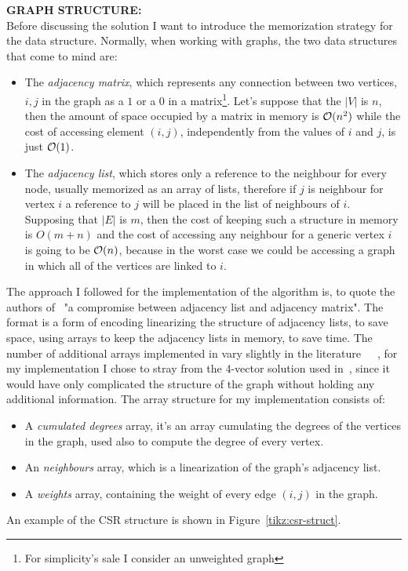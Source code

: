 \documentclass[a4paper,10pt]{article}
\begin{document}
\bigskip
{}
\makeatletter{}\makeatother\label{sec:graph-structure}
\noindent
\textbf{GRAPH STRUCTURE:}
\\
Before discussing the solution I want to introduce the memorization strategy for the data structure. Normally, when working with graphs, the two data structures that come to mind are:
\begin{itemize}
	\item The \emph{adjacency matrix}, which represents any connection between two vertices, $i, j$ in the graph as a $1$ or a $0$ in a matrix\footnote{For simplicity's sale I consider an unweighted graph}. Let's suppose that the $|V|$ is $n$, then the amount of space occupied by a matrix in memory is $\mathcal{O}(n^2)$ while the cost of accessing element $(i, j)$, independently from the values of $i$ and $j$, is just $\mathcal{O}(1)$.
	\item The \emph{adjacency list}, which stores only a reference to the neighbour for every node, usually memorized as an array of lists, therefore if $j$ is neighbour for vertex $i$ a reference to $j$ will be placed in the list of neighbours of $i$. Supposing that $|E|$ is $m$, then the cost of keeping such a structure in memory is $O(m + n)$ and the cost of accessing any neighbour for a generic vertex $i$ is going to be $\mathcal{O}(n)$, because in the worst case we could be accessing a graph in which all of the vertices are linked to $i$.
\end{itemize}
The approach I followed for the implementation of the algorithm is, to quote the authors of~\cite{generic-he-boruvka} "a compromise between adjacency list and adjacency matrix". The \csr format is a form of encoding linearizing the structure of adjacency lists, to save space, using arrays to keep the adjacency lists in memory, to save time. The number of additional arrays implemented in \csr vary slightly in the literature~\cite{csr-kelly}~\cite{csr-wheatman}~\cite{generic-he-boruvka}, for my implementation I chose to stray from the 4-vector solution used in~\cite{generic-he-boruvka}, since it would have only complicated the structure of the graph without holding any additional information.
The array structure for my implementation consists of:
\begin{itemize}
	\item A \emph{cumulated degrees} array, it's an array cumulating the degrees of the vertices in the graph, used also to compute the degree of every vertex.
	\item An \emph{neighbours} array, which is a linearization of the graph's adjacency list.
	\item A \emph{weights} array, containing the weight of every edge $(i, j)$ in the graph.
\end{itemize}
An example of the CSR structure is shown in Figure~\ref{tikz:csr-struct}.
\end{document}
